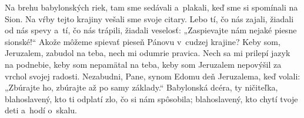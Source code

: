Na brehu babylonských riek,
tam sme sedávali a~plakali,
keď sme si spomínali na Sion.
\versseparator
Na vŕby tejto krajiny
vešali sme svoje citary.
\versseparator
Lebo tí, čo nás zajali,
žiadali od nás spevy
\versseparator
a~tí, čo nás trápili, žiadali veselosť:
„Zaspievajte nám nejaké piesne sionské!“
\versseparator
Akože môžeme spievať pieseň Pánovu
v~cudzej krajine?
\versseparator
Keby som, Jeruzalem, zabudol na teba,
nech mi odumrie pravica.
\versseparator
Nech sa mi prilepí jazyk na podnebie,
keby som nepamätal na teba,
\versseparator
keby som Jeruzalem nepovýšil
za vrchol svojej radosti.
\versseparator
Nezabudni, Pane, synom Edomu
deň Jeruzalema,
\versseparator
keď volali: „Zbúrajte ho, zbúrajte
až po samy základy.“
\versseparator
Babylonská dcéra, ty ničiteľka,
blahoslavený, kto ti odplatí zlo,
čo si nám spôsobila;
\versseparator
blahoslavený, kto chytí tvoje deti a~hodí o~skalu.